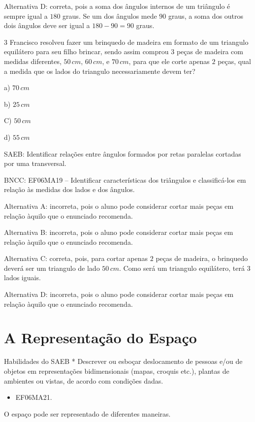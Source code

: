 Alternativa D: correta, pois a soma dos ângulos internos de um triângulo
é sempre igual a $180$ graus. Se um dos ângulos mede $90$ graus, a soma dos
outros dois ângulos deve ser igual a $180 - 90 = 90$ graus.

\num{3}  Francisco resolveu fazer um brinquedo de madeira em formato de um
triangulo equilátero para seu filho brincar, sendo assim comprou $3$ peças
de madeira com medidas diferentes, $50\,cm$, $60\,cm$, e $70\,cm$, para que ele
corte apenas $2$ peças, qual a medida que os lados do triangulo
necessariamente devem ter?

a) $70\,cm$

b) $25\,cm$

C) $50\,cm$

d) $55\,cm$

SAEB: Identificar relações entre ângulos formados por retas paralelas
cortadas por uma transversal.

BNCC: EF06MA19 -- Identificar características dos triângulos e
classificá-los em relação às medidas dos lados e dos ângulos.

Alternativa A: incorreta, pois o aluno pode considerar cortar mais peças
em relação àquilo que o enunciado recomenda.

Alternativa B: incorreta, pois o aluno pode considerar cortar mais peças
em relação àquilo que o enunciado recomenda.

Alternativa C: correta, pois, para cortar apenas $2$ peças de madeira, o
brinquedo deverá ser um triangulo de lado $50\,cm$. Como será um triangulo
equilátero, terá $3$ lados iguais.

Alternativa D: incorreta, pois o aluno pode considerar cortar mais peças
em relação àquilo que o enunciado recomenda.

\chapter{A Representação do
Espaço}

Habilidades do SAEB * Descrever ou esboçar deslocamento de pessoas e/ou
de objetos em representações bidimensionais (mapas, croquis etc.),
plantas de ambientes ou vistas, de acordo com condições dadas.


\begin{itemize}
\item EF06MA21.
\end{itemize}

O espaço pode ser representado de diferentes maneiras.

